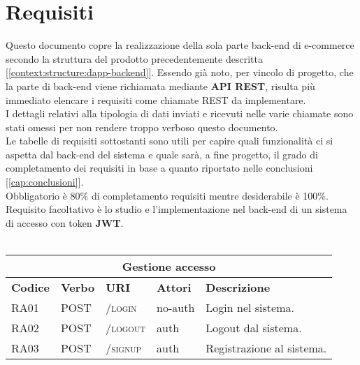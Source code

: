 \section{Requisiti}
Questo documento copre la realizzazione della sola parte back-end di e-commerce secondo la struttura del prodotto precedentemente descritta [\autoref{context:structure:dapp-backend}]. Essendo già noto, per vincolo di progetto, che la parte di back-end viene richiamata mediante \textbf{API REST}, risulta più immediato elencare i requisiti come chiamate REST da implementare.\\
I dettagli relativi alla tipologia di dati inviati e ricevuti nelle varie chiamate sono stati omessi per non rendere troppo verboso questo documento.\\
Le tabelle di requisiti sottostanti sono utili per capire quali funzionalità ci si aspetta dal back-end del sistema e quale sarà, a fine progetto, il grado di completamento dei requisiti in base a quanto riportato nelle conclusioni [\autoref{cap:conclusioni}].\\
Obbligatorio è 80\% di completamento requisiti mentre desiderabile è 100\%. Requisito facoltativo è lo studio e l'implementazione nel back-end di un sistema di accesso con token \textbf{JWT}.
\\\\
\noindent
\hspace*{-2cm}
\begin{tabular}{ |p{1.2cm}|p{1.5cm}|p{5cm}|p{2cm}|p{6cm}| }
    \hline
    \multicolumn{5}{|c|}{\textbf{Gestione accesso}}\\
    \hline
    \hline
    \textbf{Codice} & \textbf{Verbo} & \textbf{URI} & \textbf{Attori} & \textbf{Descrizione}\\
    \hline
    RA01 & POST & \textsc{/login} & no-auth & Login nel sistema.\\
    \hline
    RA02 & POST & \textsc{/logout} & auth & Logout dal sistema.\\
    \hline
    RA03 & POST & \textsc{/signup} & auth & Registrazione al sistema.\\
    \hline
\end{tabular}
\\\\\\
\hspace*{-2cm}
